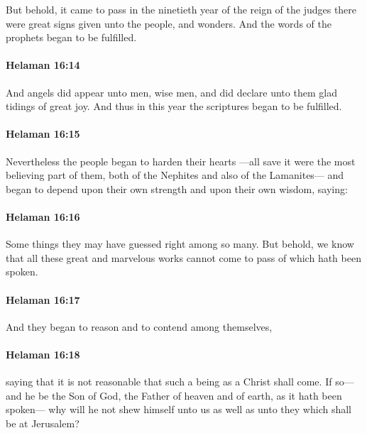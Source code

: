 			But behold, it came to pass in the ninetieth year of the reign of the judges
			there were great signs given unto the people, and wonders.
			And the words of the prophets began to be fulfilled.

		\paragraph{Helaman 16:14} %
			\label{HELAMAN-16-14}

			And angels did appear unto men, wise men,
			and did declare unto them glad tidings of great joy.
			And thus in this year the scriptures began to be fulfilled.

		\paragraph{Helaman 16:15} %
			\label{HELAMAN-16-15}

			Nevertheless the people began to harden their hearts
			---all save it were the most believing part of them,
			both of the Nephites and also of the Lamanites---
			and began to depend upon their own strength
			and upon their own wisdom, saying:

		\paragraph{Helaman 16:16} %
			\label{HELAMAN-16-16}

			Some things they may have guessed right among so many.
			But behold, we know that all these great and marvelous works
			cannot come to pass of which hath been spoken.

		\paragraph{Helaman 16:17} %
			\label{HELAMAN-16-17}

			And they began to reason and to contend among themselves,

		\paragraph{Helaman 16:18} %
			\label{HELAMAN-16-18}

			saying that it is not reasonable that such a being as a Christ shall come.
			If so---and he be the Son of God,
			the Father of heaven and of earth,
			as it hath been spoken---
			why will he not shew himself unto us
			as well as unto they which shall be at Jerusalem?

